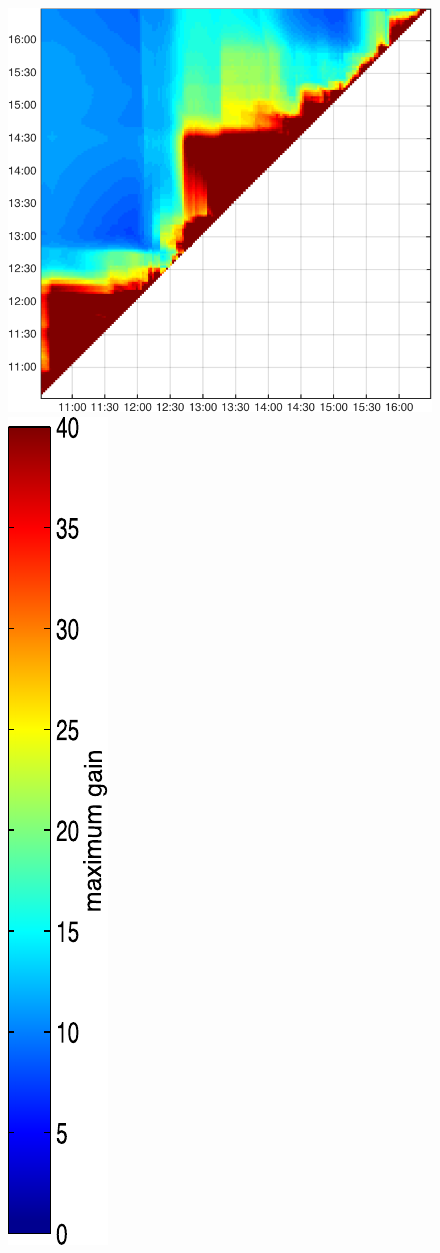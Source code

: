 \begin{figure}
\begin{minipage}[c]{\mylength}
\includegraphics[valign=t,width=\eventswidth]{events/20141111-maxGain-local-events.png}
\includegraphics[valign=t,trim=2pt -8pt 0 5pt,width=\colorbarwidth,totalheight=\eventheight]{events/colorbar-40.pdf}

\end{minipage}
\end{figure}
